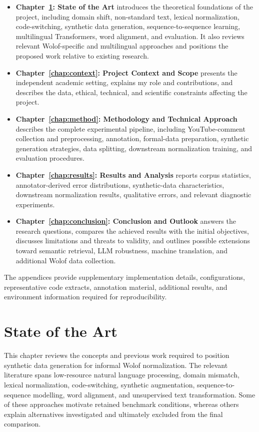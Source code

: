 \documentclass[12pt, a4paper, twoside, openany]{report}
\begin{document}
\begin{itemize}
	\item \textbf{Chapter~\ref{chap:sota}: State of the Art} introduces the theoretical foundations of the project, including domain shift, non-standard text, lexical normalization, code-switching, synthetic data generation, sequence-to-sequence learning, multilingual Transformers, word alignment, and evaluation. It also reviews relevant Wolof-specific and multilingual approaches and positions the proposed work relative to existing research.
	\item \textbf{Chapter~\ref{chap:context}: Project Context and Scope} presents the independent academic setting, explains my role and contributions, and describes the data, ethical, technical, and scientific constraints affecting the project.
	\item \textbf{Chapter~\ref{chap:method}: Methodology and Technical Approach} describes the complete experimental pipeline, including YouTube-comment collection and preprocessing, annotation, formal-data preparation, synthetic generation strategies, data splitting, downstream normalization training, and evaluation procedures.
	\item \textbf{Chapter~\ref{chap:results}: Results and Analysis} reports corpus statistics, annotator-derived error distributions, synthetic-data characteristics, downstream normalization results, qualitative errors, and relevant diagnostic experiments.
	\item \textbf{Chapter~\ref{chap:conclusion}: Conclusion and Outlook} answers the research questions, compares the achieved results with the initial objectives, discusses limitations and threats to validity, and outlines possible extensions toward semantic retrieval, LLM robustness, machine translation, and additional Wolof data collection.
\end{itemize}

The appendices provide supplementary implementation details, configurations, representative code extracts, annotation material, additional results, and environment information required for reproducibility.

\chapter{State of the Art}
\label{chap:sota}


This chapter reviews the concepts and previous work required to position synthetic data generation for informal Wolof normalization. The relevant literature spans low-resource natural language processing, domain mismatch, lexical normalization, code-switching, synthetic augmentation, sequence-to-sequence modelling, word alignment, and unsupervised text transformation. Some of these approaches motivate retained benchmark conditions, whereas others explain alternatives investigated and ultimately excluded from the final comparison.
\end{document}
